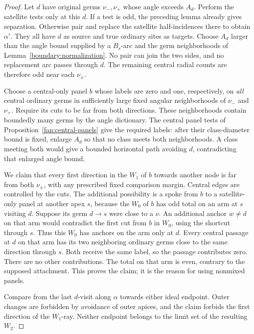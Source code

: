 \begin{proof}
Let $d$ have original germs $\nu_-,\nu_+$ whose angle exceeds $A_d$.
Perform the satellite tests only at this $d$. If a test is odd, the
preceding lemma already gives separation. Otherwise pair and replace the
satellite half-incidences there to obtain $\alpha'$. They all have $d$ as
source and true ordinary sites as targets. Choose $A_d$ larger than the
angle bound supplied by a $B_s$-arc and the germ neighborhoods of
Lemma~\ref{boundary:normalization}. No pair can join the two sides, and no
replacement arc passes through $d$. The remaining central radial counts
are therefore odd near each $\nu_\pm$.

Choose a central-only panel $b$ whose labels are zero and one,
respectively, on \emph{all} central ordinary germs in sufficiently large
fixed angular neighborhoods of $\nu_-$ and $\nu_+$. Require its cuts to
be far from both directions. These neighborhoods contain boundedly many
germs by the angle dictionary. The central panel tests of
Proposition~\ref{fan:central-panels} give the required labels: after their
class-diameter bound is fixed, enlarge $A_d$ so that no class meets both
neighborhoods. A class meeting both would give a bounded horizontal path
avoiding $d$, contradicting that enlarged angle bound.

We claim that every first direction in the $W_1$ of $b$ towards another
node is far from both $\nu_\pm$, with any prescribed fixed comparison
margin. Central edges are controlled by the cuts. The additional
possibility is a spoke from $b$ to a satellite-only panel at another apex
$s$, because the $W_0$ of $b$ has odd total on an arm at $s$ visiting $d$.
Suppose its germ $d\to s$ were close to a $\nu$. An additional anchor
$w\ne d$ on that arm would contradict the first cut from $b$ in $W_0$,
using the shortcut through $s$. Thus this $W_0$ has anchors on the arm only
at $d$. Every central passage at $d$ on that arm has its two neighboring
ordinary germs close to the same direction through $s$. Both receive the
same label, so the passage contributes zero. There are no other
contributions. The total on that arm is even, contrary to the supposed
attachment. This proves the claim; it is the reason for using nonmixed
panels.

Compare from the last $d$-visit along $\alpha$ towards either ideal
endpoint. Outer changes are forbidden by avoidance of outer apices, and
the claim forbids the first direction of the $W_1$-ray. Neither endpoint
belongs to the limit set of the resulting $W_2$.


\end{proof}
